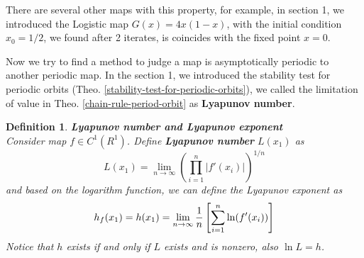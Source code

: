 \documentclass[12pt]{article}
\theoremstyle{plain}
\newtheorem{definition}{\textbf{Definition}}[section]
\begin{document}
\newpage



There are several other maps with this property, for example, in section 1, we introduced the Logistic map $G(x) = 4x(1-x)$, with the initial condition $x_0 = 1/2$, we found after 2 iterates, is coincides with the fixed point $x = 0$.

Now we try to find a method to judge a map is asymptotically periodic to another periodic map. In the section 1, we introduced the stability test for periodic orbits (Theo. \ref{stability-test-for-periodic-orbits}), we called the limitation of value in Theo. \ref{chain-rule-period-orbit} as \textbf{Lyapunov number}.

\begin{definition} \textbf{Lyapunov number and Lyapunov exponent}
\\\noindent Consider map $f \in C^1(R^1)$. Define \textbf{Lyapunov number} $L(x_1)$ as 
$$
L(x_1) = \lim_{n \rightarrow \infty}(\prod_{i = 1}^{n} |f'(x_i)|)^{1/n}
$$
and based on the logarithm function, we can define the Lyapunov exponent as
$$
h_f(x_1) = h(x_1) = \lim_{n \rightarrow \infty}{1\over n}\left[\sum_{i = 1}^{n} \ln(f'(x_i))\right]
$$
Notice that $h$ exists if and only if $L$ exists and is nonzero, also $\ln L = h$. 
\end{definition} 
\end{document}
